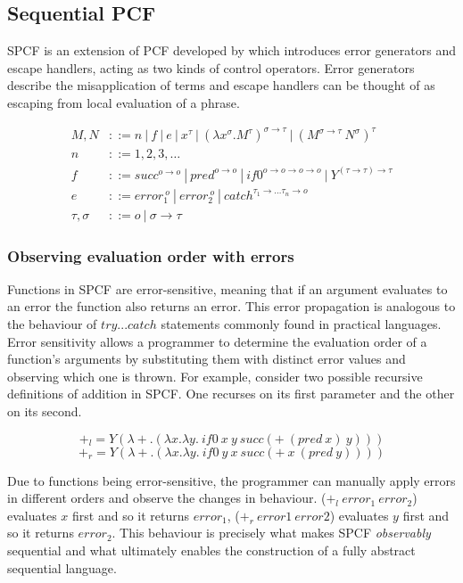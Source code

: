 \documentclass[12pt,a4paper]{report}
\theoremstyle{definition}
\theoremstyle{remark}
\begin{document}
\subsection{Sequential PCF}\label{sec:spcf}
SPCF is an extension of PCF developed by \cite{cartwright_1992} which introduces error generators and escape handlers, acting as two kinds of control operators. Error generators describe the misapplication of terms and escape handlers can be thought of as escaping from local evaluation of a phrase.

\begin{equation} \label{eq:spcf_grammar}
\begin{split}
    M,N &::= n\ |\ f\ |\ e\ |\ x^{\tau}\ |\ (\lambda x^{\sigma} .M^{\tau})^{\sigma \rightarrow \tau}\ |\ (M^{\sigma \rightarrow \tau} \ N^{\sigma})^{\tau}\\
    n &::= 1, 2, 3, \dots\\
    f &::= succ^{o \rightarrow o} \ | \ pred^{o \rightarrow o} \ | \ if0^{o \rightarrow o \rightarrow o \rightarrow o} \ | \ Y^{(\tau \rightarrow \tau) \rightarrow \tau}\\
    e &::= error_1^{\ o}\ |\ error_{2}^{\ o}\ |\ catch^{\tau_1 \rightarrow \dots \tau_n \rightarrow o}\\
    \tau , \sigma &::= o\ |\ \sigma \rightarrow \tau
\end{split}
\end{equation}

\subsubsection{Observing evaluation order with errors}
Functions in SPCF are error-sensitive, meaning that if an argument evaluates to an error the function also returns an error. This error propagation is analogous to the behaviour of $try...catch$ statements commonly found in practical languages. Error sensitivity allows a programmer to determine the evaluation order of a function's arguments by substituting them with distinct error values and observing which one is thrown. For example, consider two possible recursive definitions of addition in SPCF. One recurses on its first parameter and the other on its second.

\[+_l = Y(\lambda+.(\lambda x.\lambda y.\ if0\ x\ y\ succ (+\ (pred\ x)\ y)))\]
\[+_r = Y(\lambda+.(\lambda x.\lambda y.\ if0\ y\ x\ succ (+\ x\ (pred\ y))))\]

Due to functions being error-sensitive, the programmer can manually apply errors in different orders and observe the changes in behaviour. ($+_l\ error_1\ error_2$) evaluates $x$ first and so it returns $error_1$, ($+_r\ error1\ error2$) evaluates $y$ first and so it returns $error_2$. This behaviour is precisely what makes SPCF \textit{observably} sequential and what ultimately enables the construction of a fully abstract sequential language. 
\end{document}
